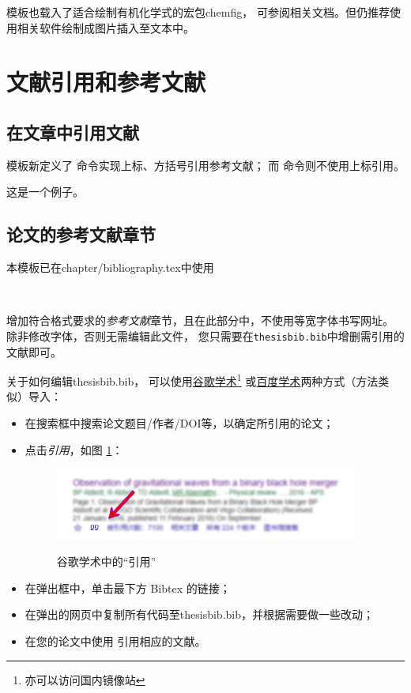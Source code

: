 	模板也载入了适合绘制有机化学式的宏包\textsf{chemfig}，
    可参阅相关文档。但仍推荐使用相关软件绘制成图片插入至文本中。
    

\section{文献引用和参考文献}\label{sec:bib}
    \subsection{在文章中引用文献}
        模板新定义了 命令实现上标、方括号引用参考文献；
        而 命令则不使用上标引用。

        这\cite{abbott2016observation}是一个例子。
	\subsection{论文的参考文献章节}
		本模板已在\textsf{chapter/bibliography.tex}中使用
	\begin{lstlisting}[firstnumber=3]


	\end{lstlisting}
	增加符合格式要求的\emph{参考文献}章节，且在此部分中，不使用等宽字体书写网址。
	除非修改字体，否则无需编辑此文件，
    您只需要在\texttt{thesisbib.bib}中增删需引用的文献即可。
    
    关于如何编辑\textsf{thesisbib.bib}，
    可以使用\href{http://scholar.google.com.cn/}{谷歌学术}\footnote{亦可以访问国内镜像站}
    或\href{http://xueshu.baidu.com}{百度学术}两种方式（方法类似）导入\BibTeX{}：
    \begin{itemize}
        \item 在搜索框中搜索论文题目/作者/DOI等，以确定所引用的论文；
        \item 点击\emph{引用}，如图 \ref{fig:addbib}：
            \begin{figure}[H]
                \centering 
                \caption{谷歌学术中的``引用''}
                \includegraphics[width=10cm]{figure/AddBib.png}
                \label{fig:addbib}
            \end{figure}
        \item 在弹出框中，单击最下方 Bibtex 的链接；
        \item 在弹出的网页中复制所有代码至\textsf{thesisbib.bib}，并根据需要做一些改动；
        \item 在您的论文中使用 引用相应的文献。
    \end{itemize}

